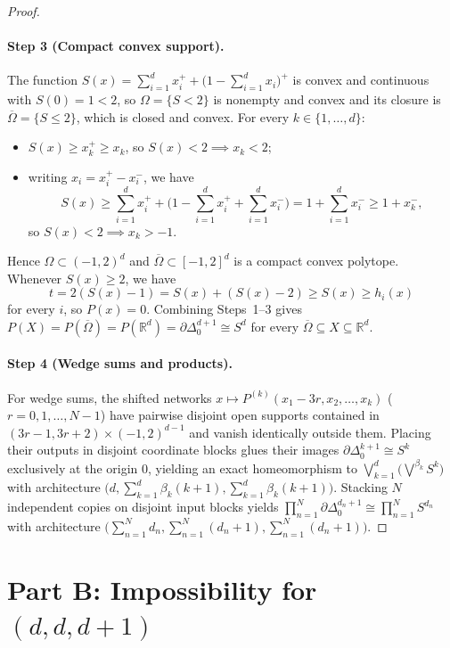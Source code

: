 \documentclass[11pt]{article}
\theoremstyle{plain}
\theoremstyle{definition}
\theoremstyle{remark}
\begin{document}
\begin{proof}
\paragraph{Step 3 (Compact convex support).}
The function $S(x) = \sum_{i=1}^d x_i^+ + \bigl(1 - \sum_{i=1}^d x_i\bigr)^+$ is convex and continuous with $S(0) = 1 < 2$, so $\Omega = \{S < 2\}$ is nonempty and convex and its closure is $\overline{\Omega} = \{S \le 2\}$, which is closed and convex. For every $k \in \{1, \dots, d\}$:
\begin{itemize}[leftmargin=2em]
\item $S(x) \ge x_k^+ \ge x_k$, so $S(x) < 2 \implies x_k < 2$;
\item writing $x_i = x_i^+ - x_i^-$, we have
\[
S(x) \ge \sum_{i=1}^d x_i^+ + \biggl(1 - \sum_{i=1}^d x_i^+ + \sum_{i=1}^d x_i^-\biggr) = 1 + \sum_{i=1}^d x_i^- \ge 1 + x_k^-,
\]
so $S(x) < 2 \implies x_k > -1$.
\end{itemize}
Hence $\Omega \subset (-1, 2)^d$ and $\overline{\Omega} \subset [-1, 2]^d$ is a compact convex polytope. Whenever $S(x) \ge 2$, we have
\[
t = 2(S(x) - 1) = S(x) + (S(x) - 2) \ge S(x) \ge h_i(x)
\]
for every $i$, so $P(x) = 0$. Combining Steps~1--3 gives $P(X) = P(\overline{\Omega}) = P(\mathbb{R}^d) = \partial \Delta_0^{d+1} \cong S^d$ for every $\overline{\Omega} \subseteq X \subseteq \mathbb{R}^d$.

\paragraph{Step 4 (Wedge sums and products).}
For wedge sums, the shifted networks $x \mapsto P^{(k)}(x_1 - 3r, x_2, \dots, x_k)$ ($r = 0, 1, \dots, N-1$) have pairwise disjoint open supports contained in $(3r - 1, 3r + 2) \times (-1, 2)^{d-1}$ and vanish identically outside them. Placing their outputs in disjoint coordinate blocks glues their images $\partial \Delta_0^{k+1} \cong S^k$ exclusively at the origin $0$, yielding an exact homeomorphism to $\bigvee_{k=1}^d \bigl(\bigvee^{\beta_k} S^k\bigr)$ with architecture $\bigl(d, \sum_{k=1}^d \beta_k(k+1), \sum_{k=1}^d \beta_k(k+1)\bigr)$.
Stacking $N$ independent copies on disjoint input blocks yields $\prod_{n=1}^N \partial \Delta_0^{d_n+1} \cong \prod_{n=1}^N S^{d_n}$ with architecture $\bigl(\sum_{n=1}^N d_n, \sum_{n=1}^N (d_n+1), \sum_{n=1}^N (d_n+1)\bigr)$.
\end{proof}

\section{Part B: Impossibility for $(d, d, d+1)$}
\end{document}

